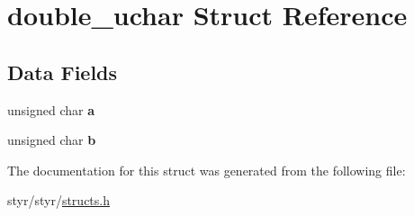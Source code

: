 \hypertarget{structdouble__uchar}{}\section{double\+\_\+uchar Struct Reference}
\label{structdouble__uchar}
\subsection*{Data Fields}
\begin{DoxyCompactItemize}
\item 
unsigned char {\bfseries a}\hypertarget{structdouble__uchar_a24420a9beaac7cee08b5e255a4c29db1}{}\label{structdouble__uchar_a24420a9beaac7cee08b5e255a4c29db1}

\item 
unsigned char {\bfseries b}\hypertarget{structdouble__uchar_a41cede1b4c0d05cff170ad5761f70964}{}\label{structdouble__uchar_a41cede1b4c0d05cff170ad5761f70964}

\end{DoxyCompactItemize}


The documentation for this struct was generated from the following file\+:\begin{DoxyCompactItemize}
\item 
styr/styr/\hyperlink{structs_8h}{structs.\+h}\end{DoxyCompactItemize}
